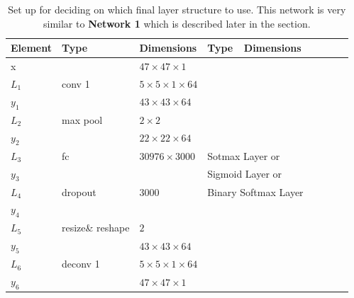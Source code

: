 \begin{table}[h!]
\centering
{\footnotesize
\begin{tabular}{|lllllllll|}
\hline
\multicolumn{1}{|l|}{Element} & Type     & \multicolumn{1}{l|}{Dimensions}                     & Type     & \multicolumn{1}{l|}{Dimensions} \\ \hline
\multicolumn{1}{|l|}{x}       &          & \multicolumn{1}{l|}{$47\times47\times1$}            &          & \multicolumn{1}{l|}{}          \\ \hline
\multicolumn{1}{|l|}{$L_1$}   & conv 1   & \multicolumn{1}{l|}{$5\times 5\times1\times 64$}    &          & \multicolumn{1}{l|}{}          \\
\multicolumn{1}{|l|}{$y_1$}   &          & \multicolumn{1}{l|}{$43\times43\times64$}           &          & \multicolumn{1}{l|}{}          \\ \hline
\multicolumn{1}{|l|}{$L_2$}   & max pool & \multicolumn{1}{l|}{$2\times 2$}                    &          & \multicolumn{1}{l|}{}          \\
\multicolumn{1}{|l|}{$y_2$}   &          & \multicolumn{1}{l|}{$22\times22\times 64$}          &          & \multicolumn{1}{l|}{}          \\ \hline
\multicolumn{1}{|l|}{$L_3$}   & fc       & \multicolumn{1}{l|}{$30976\times3000$}              & \multicolumn{2}{l|}{Sotmax Layer or}      \\
\multicolumn{1}{|l|}{$y_3$}   &          & \multicolumn{1}{l|}{}                               & \multicolumn{2}{l|}{Sigmoid Layer or}     \\
\multicolumn{1}{|l|}{$L_4$}   & dropout  & \multicolumn{1}{l|}{$3000$}                         & \multicolumn{2}{l|}{Binary Softmax Layer} \\
\multicolumn{1}{|l|}{$y_4$}   &          & \multicolumn{1}{l|}{}                               &          & \multicolumn{1}{l|}{}          \\ \hline
\multicolumn{1}{|l|}{$L_5$}   & resize\& reshape & \multicolumn{1}{l|}{$2$}                    &          & \multicolumn{1}{l|}{}          \\
\multicolumn{1}{|l|}{$y_5$}   &          & \multicolumn{1}{l|}{$43\times43\times 64$}          &          & \multicolumn{1}{l|}{}          \\ \hline
\multicolumn{1}{|l|}{$L_6$}   & deconv 1   & \multicolumn{1}{l|}{$5\times 5\times1\times 64$}  &          & \multicolumn{1}{l|}{}\\
\multicolumn{1}{|l|}{$y_6$}   &          & \multicolumn{1}{l|}{$47\times47\times1$}            &          & \multicolumn{1}{l|}{}         \\ \hline
\end{tabular}

\caption{Set up for deciding on which final layer structure to use.
This network is very similar to \textbf{Network 1} which is described later in the section.} \label{net:classcompnet}

}
\end{table}


